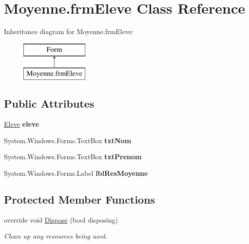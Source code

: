 \hypertarget{class_moyenne_1_1frm_eleve}{}\section{Moyenne.\+frm\+Eleve Class Reference}
\label{class_moyenne_1_1frm_eleve}
Inheritance diagram for Moyenne.\+frm\+Eleve\+:\begin{figure}[H]
\begin{center}
\leavevmode
\includegraphics[height=2.000000cm]{class_moyenne_1_1frm_eleve}
\end{center}
\end{figure}
\subsection*{Public Attributes}
\begin{DoxyCompactItemize}
\item 
\mbox{\label{class_moyenne_1_1frm_eleve_a96e485d73fdd41f75e323888627e4cc1}} 
\hyperlink{class_moyenne_1_1_eleve}{Eleve} {\bfseries eleve}
\item 
\mbox{\label{class_moyenne_1_1frm_eleve_a566d185b38c1066b802d71d323d33b81}} 
System.\+Windows.\+Forms.\+Text\+Box {\bfseries txt\+Nom}
\item 
\mbox{\label{class_moyenne_1_1frm_eleve_a6bc0c3da466fcad44a803b0a879a8775}} 
System.\+Windows.\+Forms.\+Text\+Box {\bfseries txt\+Prenom}
\item 
\mbox{\label{class_moyenne_1_1frm_eleve_aff501043537d2300e18e2fd030add04a}} 
System.\+Windows.\+Forms.\+Label {\bfseries lbl\+Res\+Moyenne}
\end{DoxyCompactItemize}
\subsection*{Protected Member Functions}
\begin{DoxyCompactItemize}
\item 
override void \hyperlink{class_moyenne_1_1frm_eleve_a4cd27dbd3a275339051774b7faf22331}{Dispose} (bool disposing)
\begin{DoxyCompactList}\small\item\em Clean up any resources being used. \end{DoxyCompactList}\end{DoxyCompactItemize}


